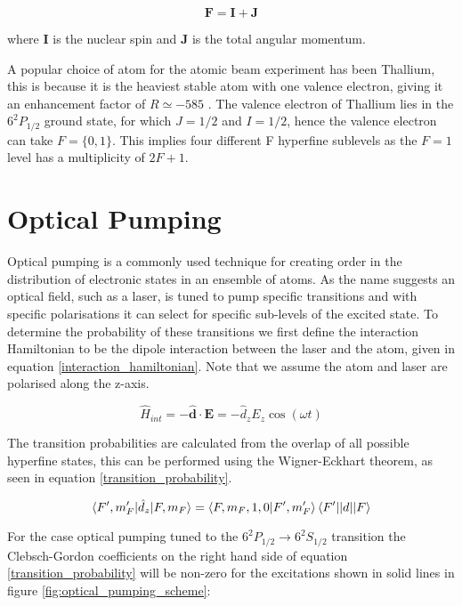 \begin{equation} \label{total_spin}
    \textbf{F} = \textbf{I} + \textbf{J}
\end{equation}

where $\textbf{I}$ is the nuclear spin and $\textbf{J}$ is the total angular momentum.
 
A popular choice of atom for the atomic beam experiment has been Thallium, this is because it is the heaviest stable atom with one valence electron, giving it an enhancement factor of $R \simeq -585$ \cite{Liu_1992}. The valence electron of Thallium lies in the $6^2P_{1/2}$ ground state, for which $J = 1/2$ and $I = 1/2$, hence the valence electron can take $F = \{0, 1\}$. This implies four different F hyperfine sublevels as the $F = 1$ level has a multiplicity of $2F + 1$.

\section{Optical Pumping}
\label{optical_pumping}

Optical pumping is a commonly used technique for creating order in the distribution of electronic states in an ensemble of atoms. As the name suggests an optical field, such as a laser, is tuned to pump specific transitions and with specific polarisations it can select for specific sub-levels of the excited state. To determine the probability of these transitions we first define the interaction Hamiltonian to be the dipole interaction between the laser and the atom, given in equation \ref{interaction_hamiltonian}. Note that we assume the atom and laser are polarised along the z-axis.

\begin{equation} \label{interaction_hamiltonian}
    \hat{H}_{int} =  - \hat{\mathbf{d}} \cdot \mathbf{E} =  - \hat{d}_z E_{z} \cos({\omega t})
\end{equation}

The transition probabilities are calculated from the overlap of all possible hyperfine states, this can be performed using the Wigner-Eckhart theorem, as seen in equation \ref{transition_probability}.

\begin{equation} \label{transition_probability}
    \braket{F',m_F'|\hat{d}_z|F,m_F} = \braket{F,m_F,1,0|F',m_F'} \braket{F'||d||F}
\end{equation}

For the case optical pumping tuned to the $6^2P_{1/2} \rightarrow 6^2S_{1/2}$ transition the Clebsch-Gordon coefficients on the right hand side of equation \ref{transition_probability} will be non-zero for the excitations shown in solid lines in figure \ref{fig:optical_pumping_scheme}:

